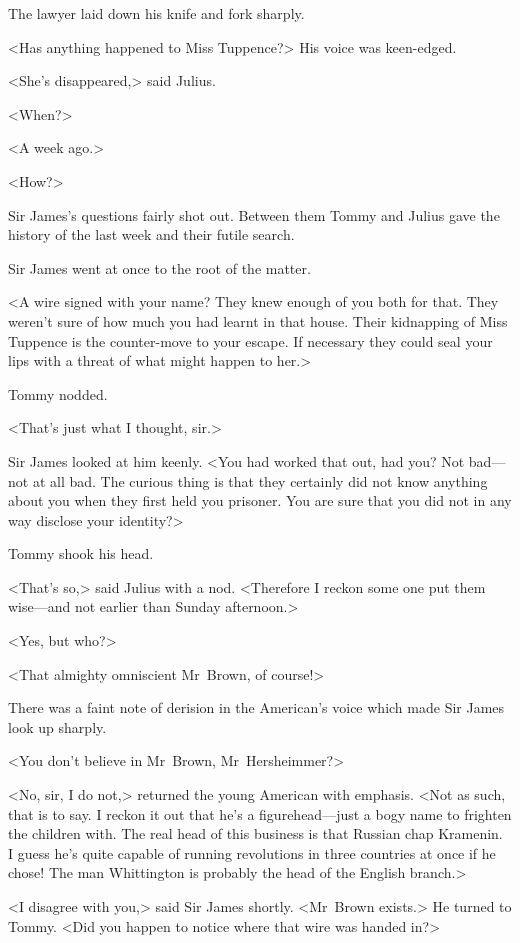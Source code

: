 The lawyer laid down his knife and fork sharply.

<Has anything happened to Miss Tuppence?> His voice was keen-edged.

<She's disappeared,> said Julius.

<When?>

<A week ago.>

<How?>

Sir James's questions fairly shot out. Between them Tommy and Julius gave the history of the last week and their futile search.

Sir James went at once to the root of the matter.

<A wire signed with your name? They knew enough of you both for that. They weren't sure of how much you had learnt in that house. Their kidnapping of Miss Tuppence is the counter-move to your escape. If necessary they could seal your lips with a threat of what might happen to her.>

Tommy nodded.

<That's just what I thought, sir.>

Sir James looked at him keenly. <You had worked that out, had you? Not bad—not at all bad. The curious thing is that they certainly did not know anything about you when they first held you prisoner. You are sure that you did not in any way disclose your identity?>

Tommy shook his head.

<That's so,> said Julius with a nod. <Therefore I reckon some one put them wise—and not earlier than Sunday afternoon.>

<Yes, but who?>

<That almighty omniscient Mr~Brown, of course!>

There was a faint note of derision in the American's voice which made Sir James look up sharply.

<You don't believe in Mr~Brown, Mr~Hersheimmer?>

<No, sir, I do not,> returned the young American with emphasis. <Not as such, that is to say. I reckon it out that he's a figurehead—just a bogy name to frighten the children with. The real head of this business is that Russian chap Kramenin. I guess he's quite capable of running revolutions in three countries at once if he chose! The man Whittington is probably the head of the English branch.>

<I disagree with you,> said Sir James shortly. <Mr~Brown exists.> He turned to Tommy. <Did you happen to notice where that wire was handed in?>

